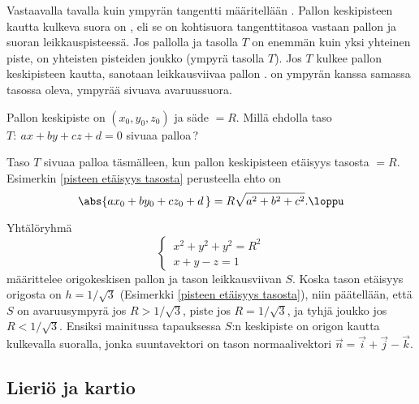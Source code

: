 Vastaavalla tavalla kuin ympyrän tangentti määritellään
%
. Pallon keskipisteen kautta kulkeva suora on
%
, eli se on kohtisuora tangenttitasoa
vastaan pallon ja suoran leikkauspisteessä. Jos pallolla ja tasolla $T$ on enemmän kuin yksi 
yhteinen piste, on yhteisten pisteiden joukko
%
 (ympyrä tasolla $T$). Jos $T$
kulkee pallon keskipisteen kautta, sanotaan leikkausviivaa pallon
%
.
 on ympyrän kanssa samassa tasossa oleva, ympyrää sivuava
avaruussuora.
\begin{Exa} Pallon keskipiste on $(x_0,y_0,z_0)$ ja säde $=R$. Millä ehdolla taso 
$T:\ ax+by+cz+d=0$ sivuaa palloa\,?
\end{Exa}
\ratk Taso $T$ sivuaa palloa täsmälleen, kun pallon keskipisteen etäisyys tasosta $=R$.
Esimerkin \ref{pisteen etäisyys tasosta} perusteella ehto on
\[
\abs{ax_0+by_0+cz_0+d\,} =R\sqrt{a^2+b^2+c^2}. \loppu
\]
\begin{Exa} Yhtälöryhmä
\[ \begin{cases}
\,x^2+y^2+y^2=R^2 \\ \,x+y-z=1
\end{cases} \]
määrittelee origokeskisen pallon ja tason leikkausviivan $S$. Koska tason etäisyys origosta on
$h=1/\sqrt{3}$ (Esimerkki \ref{pisteen etäisyys tasosta}), niin päätellään, että $S$ on 
avaruusympyrä jos $R>1/\sqrt{3}$, piste jos $R=1/\sqrt{3}$, ja tyhjä joukko jos $R<1/\sqrt{3}$.
Ensiksi mainitussa tapauksessa $S$:n keskipiste on origon kautta kulkevalla suoralla, jonka 
suuntavektori on tason normaalivektori $\vec n=\vec i+\vec j-\vec k$. \loppu
\end{Exa}

\subsection{Lieriö ja kartio}
 

